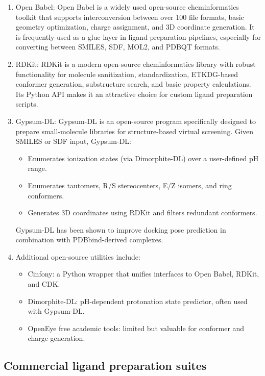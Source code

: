 \documentclass[12pt, a4paper]{article}
\begin{document}
\begin{enumerate}
\item Open Babel: Open Babel is a widely used open-source cheminformatics toolkit that supports interconversion between over 100 file formats, basic geometry optimization, charge assignment, and 3D coordinate generation.\cite{CH6_OBoyle2011} It is frequently used as a glue layer in ligand preparation pipelines, especially for converting between SMILES, SDF, MOL2, and PDBQT formats.

\item RDKit: RDKit is a modern open-source cheminformatics library with robust functionality for molecule sanitization, standardization, ETKDG-based conformer generation, substructure search, and basic property calculations.\cite{CH6_Riniker2015} Its Python API makes it an attractive choice for custom ligand preparation scripts.

\item Gypsum-DL: Gypsum-DL is an open-source program specifically designed to prepare small-molecule libraries for structure-based virtual screening.\cite{CH6_Ropp2019} Given SMILES or SDF input, Gypsum-DL:
\begin{itemize}
  \item Enumerates ionization states (via Dimorphite-DL) over a user-defined pH range.
  \item Enumerates tautomers, R/S stereocenters, E/Z isomers, and ring conformers.
  \item Generates 3D coordinates using RDKit and filters redundant conformers.
\end{itemize}
Gypsum-DL has been shown to improve docking pose prediction in combination with PDBbind-derived complexes.\cite{CH6_Ropp2019}

\item Additional open-source utilities include:
\begin{itemize}
  \item Cinfony: a Python wrapper that unifies interfaces to Open Babel, RDKit, and CDK.\cite{CH6_Cinfony}
  \item Dimorphite-DL: pH-dependent protonation state predictor, often used with Gypsum-DL.
  \item OpenEye free academic tools: limited but valuable for conformer and charge generation.
\end{itemize}
\end{enumerate}

\subsection{Commercial ligand preparation suites}
\end{document}
